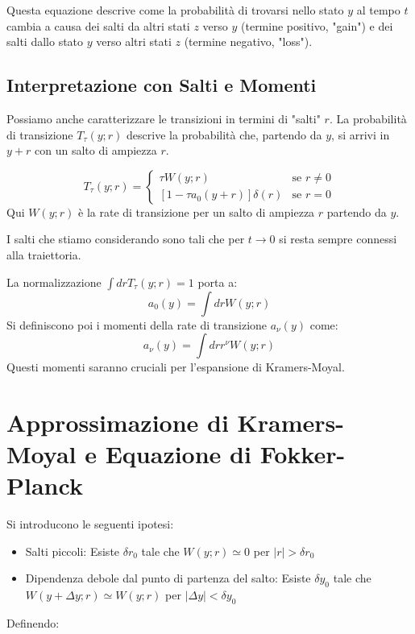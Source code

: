 Questa equazione descrive come la probabilità di trovarsi nello stato $y$ al tempo $t$ cambia a causa dei salti da altri stati $z$ verso $y$ (termine positivo, "gain") e dei salti dallo stato $y$ verso altri stati $z$ (termine negativo, "loss").

\subsection{ Interpretazione con Salti e Momenti}

Possiamo anche caratterizzare le transizioni in termini di "salti" $r$. La probabilità di transizione $T_\tau(y;r)$ descrive la probabilità che, partendo da $y$, si arrivi in $y+r$ con un salto di ampiezza $r$. 

\begin{equation}
T_{\tau}(y;r) =
\begin{cases}
\tau W(y;r) & \text{se } r \neq 0 \\
[1-\tau a_0(y+r)]\delta(r) & \text{se } r = 0
\end{cases}
\end{equation}
Qui $W(y;r)$ è la rate di transizione per un salto di ampiezza $r$ partendo da $y$.

I salti che stiamo considerando sono tali che per $t \to 0$ si resta sempre connessi alla traiettoria.

La normalizzazione $\int dr T_{\tau}(y;r) = 1$ porta a:
\begin{equation}
a_0(y) = \int dr W(y;r)
\end{equation}
Si definiscono poi i momenti della rate di transizione $a_{\nu}(y)$ come:
\begin{equation}
a_{\nu}(y) = \int dr r^{\nu} W(y;r)  
\end{equation}
Questi momenti saranno cruciali per l'espansione di Kramers-Moyal.

\section{ Approssimazione di Kramers-Moyal e Equazione di Fokker-Planck}

Si introducono le seguenti ipotesi:
\begin{itemize}
    \item Salti piccoli: Esiste $\delta r_0$ tale che $W(y;r) \simeq 0$ per $|r| > \delta r_0$
\item Dipendenza debole dal punto di partenza del salto:
Esiste $\delta y_0$ tale che $W(y+ \Delta y;r) \simeq W(y;r)$ per $|\Delta y| < \delta y_0$
    
\end{itemize} 
Definendo: 

